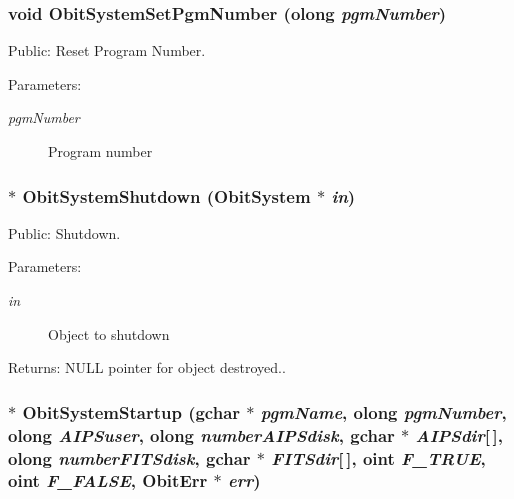 \subsubsection{\setlength{\rightskip}{0pt plus 5cm}void Obit\-System\-Set\-Pgm\-Number ({\bf olong} {\em pgm\-Number})}\label{ObitSystem_8h_a16}


Public: Reset Program Number. 

\begin{Desc}
\item[Parameters:]
\begin{description}
\item[{\em pgm\-Number}]Program number \end{description}
\end{Desc}
\subsubsection{$\ast$ Obit\-System\-Shutdown ({\bf Obit\-System} $\ast$ {\em in})}\label{ObitSystem_8h_a8}


Public: Shutdown. 

\begin{Desc}
\item[Parameters:]
\begin{description}
\item[{\em in}]Object to shutdown \end{description}
\end{Desc}
\begin{Desc}
\item[Returns:]NULL pointer for object destroyed.. \end{Desc}
\subsubsection{$\ast$ Obit\-System\-Startup (gchar $\ast$ {\em pgm\-Name}, {\bf olong} {\em pgm\-Number}, {\bf olong} {\em AIPSuser}, {\bf olong} {\em number\-AIPSdisk}, gchar $\ast$ {\em AIPSdir}[$\,$], {\bf olong} {\em number\-FITSdisk}, gchar $\ast$ {\em FITSdir}[$\,$], {\bf oint} {\em F\_\-TRUE}, {\bf oint} {\em F\_\-FALSE}, {\bf Obit\-Err} $\ast$ {\em err})}\label{ObitSystem_8h_a6}


